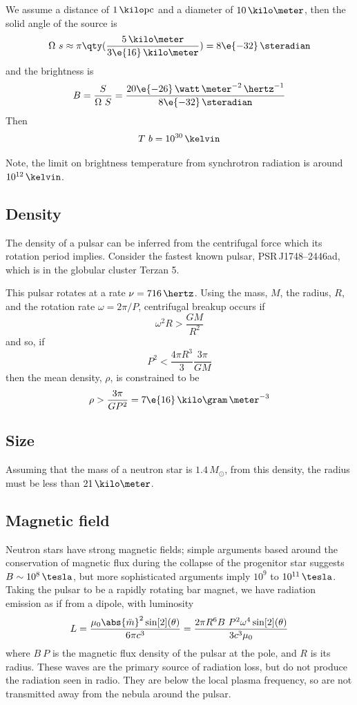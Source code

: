 \begin{example}
  We assume a distance of $1\,\kilo\text{pc}$ and a diameter of
  $10\,\kilo\meter$, then the solid angle of the source is
\[ \Omega~s \approx \pi \qty( \frac{5\,\kilo\meter}{3\e{16}\,\kilo\meter} ) = 8\e{-32}\,\steradian \]
and the brightness is
\[ B = \frac{S}{\Omega~S} = \frac{20\e{-26}\,\watt\,\meter^{-2}\,\hertz^{-1}}{8\e{-32}\,\steradian} \]
Then
\[ T~b = 10^{30}\,\kelvin \]
\end{example}
Note, the limit on brightness temperature from synchrotron radiation is around $10^{12}\,\kelvin$.

\subsection{Density}
\label{sec:density}

The density of a pulsar can be inferred from the centrifugal force
which its rotation period implies.  Consider the fastest known pulsar,
PSR\,J1748--2446ad, which is in the globular cluster Terzan 5.

\begin{example}
  This pulsar rotates at a rate $\nu = 716\,\hertz$. Using the mass,
  $M$, the radius, $R$, and the rotation rate $\omega = 2 \pi / P$,
  centrifugal breakup occurs if
\[ \omega^2 R > \frac{GM}{R^2} \]
and so, if 
\[ P^2 < \frac{4 \pi R^3}{3} \frac{3 \pi}{GM} \] then the mean
density, $\rho$, is constrained to be \[\rho > \frac{3 \pi}{GP^2} =
7\e{16}\,\kilo\gram\,\meter^{-3} \]
\end{example}

\subsection{Size}
\label{sec:size}

Assuming that the mass of a neutron star is $1.4\,M_{\odot}$, from
this density, the radius must be less than $21\,\kilo\meter$.

\subsection{Magnetic field}
\label{sec:magnetic-field}

Neutron stars have strong magnetic fields; simple arguments based
around the conservation of magnetic flux during the collapse of the
progenitor star suggests $B \sim 10^8\,\tesla$, but more sophisticated
arguments imply $10^9$ to $10^{11}\,\tesla$. Taking the pulsar to be a
rapidly rotating bar magnet, we have radiation emission as if from a
dipole, with luminosity
\begin{equation}
  \label{eq:90}
  L = \frac{\mu_0 \abs{\ddot{m}}^2 \sin[2](\theta)}{6 \pi c^3} = \frac{2 \pi R^6 B~P^2 \omega^4 \sin[2](\theta)}{3 c^3 \mu_0}
\end{equation}
where $B~P$ is the magnetic flux density of the pulsar at the pole,
and $R$ is its radius. These waves are the primary source of radiation
loss, but do not produce the radiation seen in radio. They are below
the local plasma frequency, so are not transmitted away from the
nebula around the pulsar.

